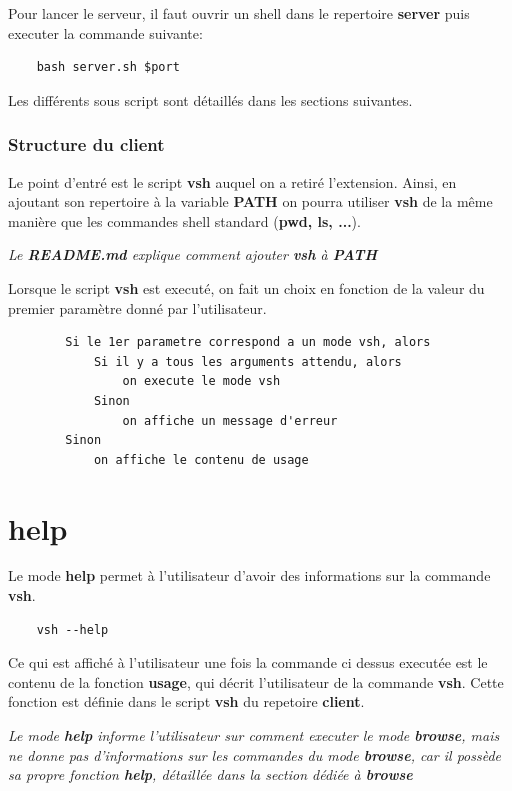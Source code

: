 \documentclass[titlepage]{article}
\begin{document}
	Pour lancer le serveur, il faut ouvrir un shell dans le repertoire \textbf{server} puis executer la commande suivante:

	\begin{lstlisting}
	bash server.sh $port
	\end{lstlisting}

	Les différents sous script sont détaillés dans les sections suivantes.

	\subsubsection{Structure du client}
	Le point d'entré est le script \textbf{vsh} auquel on a retiré l'extension. Ainsi, en ajoutant son repertoire à la variable \textbf{PATH} on pourra utiliser \textbf{vsh} de la même manière que les commandes shell standard (\textbf{pwd, ls, ...}). 

	\textit{Le \textbf{README.md} explique comment ajouter \textbf{vsh} à \textbf{PATH}}

	Lorsque le script \textbf{vsh} est executé, on fait un choix en fonction de la valeur du premier paramètre donné par l'utilisateur.
	\begin{lstlisting}
		Si le 1er parametre correspond a un mode vsh, alors
			Si il y a tous les arguments attendu, alors
				on execute le mode vsh
			Sinon
				on affiche un message d'erreur
		Sinon
			on affiche le contenu de usage
	\end{lstlisting}

	\section{help}

	Le mode \textbf{help} permet à l'utilisateur d'avoir des informations sur la commande \textbf{vsh}. 

	\begin{lstlisting}
	vsh --help
	\end{lstlisting}

	Ce qui est affiché à l'utilisateur une fois la commande ci dessus executée est le contenu de la fonction \textbf{usage}, qui décrit l'utilisateur de la commande \textbf{vsh}. Cette fonction est définie dans le script \textbf{vsh} du repetoire \textbf{client}.

	\textit{Le mode \textbf{help} informe l'utilisateur sur comment executer le mode \textbf{browse}, mais ne donne pas d'informations sur les commandes du mode \textbf{browse}, car il possède sa propre fonction \textbf{help}, détaillée dans la section dédiée à \textbf{browse}}
\end{document}
